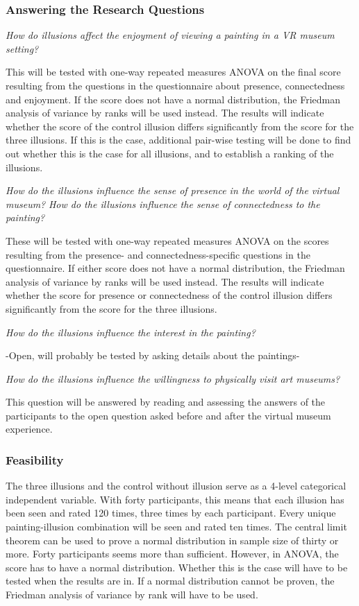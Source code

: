 \documentclass[a4paper]{article}
\begin{document}
\subsubsection{Answering the Research Questions}

\emph{How do illusions affect the enjoyment of viewing a painting in a VR museum setting?}

This will be tested with one-way repeated measures ANOVA on the final score resulting from the questions in the questionnaire about presence, connectedness and enjoyment. If the score does not have a normal distribution, the Friedman analysis of variance by ranks will be used instead. The results will indicate whether the score of the control illusion differs significantly from the score for the three illusions. If this is the case, additional pair-wise testing will be done to find out whether this is the case for all illusions, and to establish a ranking of the illusions. 

\emph{How do the illusions influence the sense of presence in the world of the virtual museum?}
\emph{How do the illusions influence the sense of connectedness to the painting?}

These will be tested with one-way repeated measures ANOVA on the scores resulting from the presence- and connectedness-specific questions in the questionnaire. If either score does not have a normal distribution, the Friedman analysis of variance by ranks will be used instead. The results will indicate whether the score for presence or connectedness of the control illusion differs significantly from the score for the three illusions.

\emph{How do the illusions influence the interest in the painting?}

-Open, will probably be tested by asking details about the paintings-

\emph{How do the illusions influence the willingness to physically visit art museums?}

This question will be answered by reading and assessing the answers of the participants to the open question asked before and after the virtual museum experience.


\subsubsection{Feasibility}
The three illusions and the control without illusion serve as a 4-level categorical independent variable. With forty participants, this means that each illusion has been seen and rated 120 times, three times by each participant. Every unique painting-illusion combination will be seen and rated ten times. The central limit theorem can be used to prove a normal distribution in sample size of thirty or more. Forty participants seems more than sufficient. However, in ANOVA, the score has to have a normal distribution. Whether this is the case will have to be tested when the results are in. If a normal distribution cannot be proven, the Friedman analysis of variance by rank will have to be used. 
\end{document}
